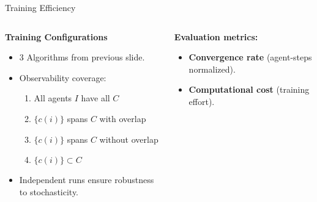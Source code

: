\begin{frame}{Training Efficiency}
\begin{columns}
    \begin{column}{0.5\linewidth}
        \textbf{Training Configurations}
            \begin{itemize}
                \item 3 Algorithms from previous slide.
                \item Observability coverage:
                    \begin{enumerate}
                        \item All agents \(I\) have all \(C\)
                        \item \(\{c(i)\}\) spans \(C\) with overlap
                        \item \(\{c(i)\}\) spans \(C\) without overlap
                        \item \(\{c(i)\} \subset C\) 
                    \end{enumerate}
                \item Independent runs ensure robustness to stochasticity.
            \end{itemize}
    \end{column}
    \begin{column}{0.5\linewidth}
        \textbf{Evaluation metrics:}
            \begin{itemize}
                \item \textbf{Convergence rate} (agent-steps normalized).
                \item \textbf{Computational cost} (training effort).
            \end{itemize}
    \end{column}
\end{columns}
\end{frame}





